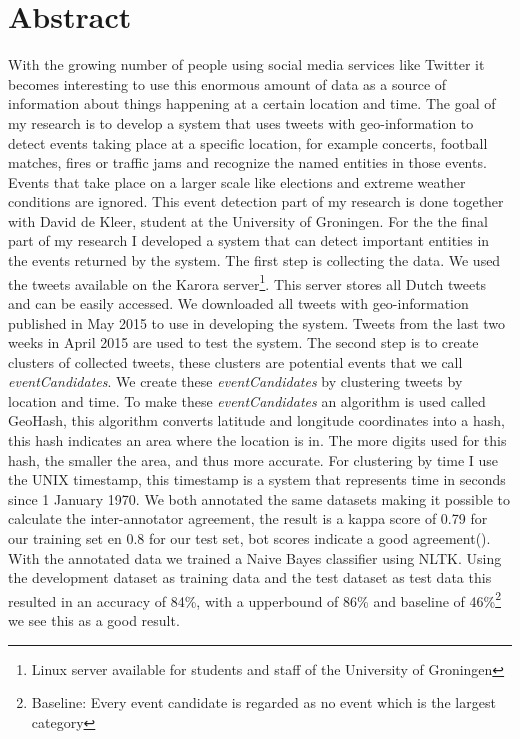 \documentclass[
10pt, %
a4paper, %
oneside, %
headinclude,footinclude, %
BCOR5mm, %
]{scrartcl}
\begin{document}
\section*{Abstract} %
With the growing number of people using social media services like Twitter it becomes interesting to use this enormous amount of data as a source of information about things happening at a certain location and time. 
\vl
The goal of my research is to develop a system that uses tweets with geo-information to detect events taking place at a specific location, for example concerts, football matches, fires or traffic jams and recognize the named entities in those events. Events that take place on a larger scale like elections and extreme weather conditions are ignored. This event detection part of my research is done together with David de Kleer, student at the University of Groningen. For the the final part of my research I developed a system that can detect important entities in the events returned by the system.
\vl
The first step is collecting the data. We used the tweets available on the Karora server\footnote{Linux server available for students and staff of the University of Groningen}. This server stores all Dutch tweets and can be easily accessed. We downloaded all tweets with geo-information published in May 2015 to use in developing the system. Tweets from the last two weeks in April 2015 are used to test the system.
\vl
The second step is to create clusters of collected tweets, these clusters are potential events that we call \textit{eventCandidates}. We create these \textit{eventCandidates} by clustering tweets by location and time. To make these \textit{eventCandidates} an algorithm is used called GeoHash, this  algorithm converts latitude and longitude coordinates into a hash, this hash indicates an area where the location is in. The more digits used for this hash, the smaller the area, and thus more accurate. For clustering by time I use the UNIX timestamp, this timestamp is a system that represents time in seconds since 1 January 1970.
\vl
We both annotated the same datasets making it possible to calculate the inter-annotator agreement, the result is a kappa score of 0.79 for our training set en 0.8 for our test set, bot scores indicate a good agreement(\citealt{manning2008introduction}). With the annotated data we trained a Naive Bayes classifier using NLTK. Using the development dataset as training data and the test dataset as test data this resulted in an accuracy of 84\%, with a upperbound of 86\% and baseline of 46\%\footnote{Baseline: Every event candidate is regarded as no event which is the largest category} we see this as a good result.
\end{document}
